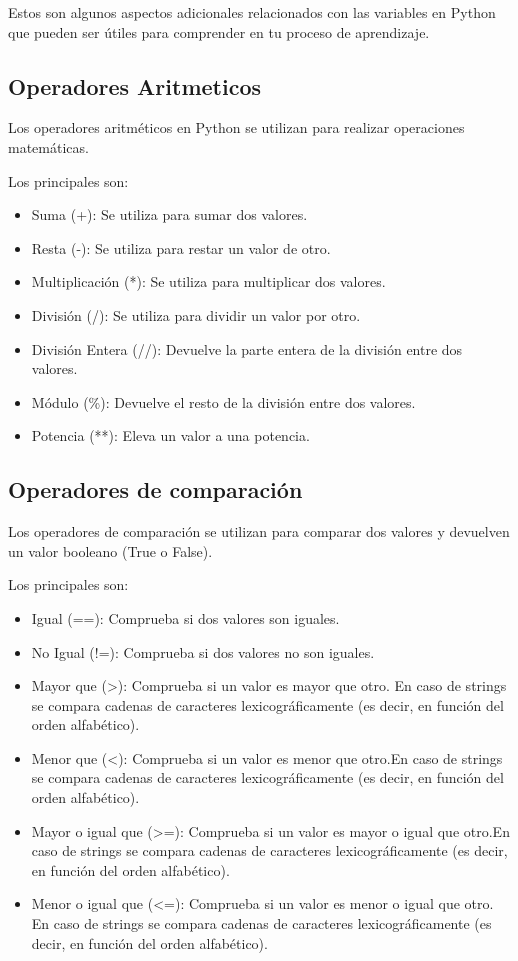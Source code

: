 Estos son algunos aspectos adicionales relacionados con las variables en Python que pueden ser útiles para comprender en tu proceso de aprendizaje.

\subsection{Operadores Aritmeticos}
Los operadores aritméticos en Python se utilizan para realizar operaciones matemáticas. 

Los principales son:
\begin{itemize}
    \item Suma (+): Se utiliza para sumar dos valores.
    \item Resta (-): Se utiliza para restar un valor de otro.
    \item Multiplicación (*): Se utiliza para multiplicar dos valores.
    \item División (/): Se utiliza para dividir un valor por otro.
    \item División Entera (//): Devuelve la parte entera de la división entre dos valores.
    \item Módulo (\%): Devuelve el resto de la división entre dos valores.
    \item Potencia (**): Eleva un valor a una potencia.
  \end{itemize}  

\subsection{Operadores de comparación}
Los operadores de comparación se utilizan para comparar dos valores y devuelven un valor booleano (True o False). 

Los principales son:
\begin{itemize}
    \item Igual (==): Comprueba si dos valores son iguales.
    \item No Igual (!=): Comprueba si dos valores no son iguales.
    \item Mayor que (>): Comprueba si un valor es mayor que otro. En caso de strings se compara cadenas de caracteres lexicográficamente (es decir, en función del orden alfabético).
    \item Menor que (<): Comprueba si un valor es menor que otro.En caso de strings se compara cadenas de caracteres lexicográficamente (es decir, en función del orden alfabético).
    \item Mayor o igual que (>=): Comprueba si un valor es mayor o igual que otro.En caso de strings se compara cadenas de caracteres lexicográficamente (es decir, en función del orden alfabético).
    \item Menor o igual que (<=): Comprueba si un valor es menor o igual que otro. En caso de strings se compara cadenas de caracteres lexicográficamente (es decir, en función del orden alfabético).
\end{itemize}

